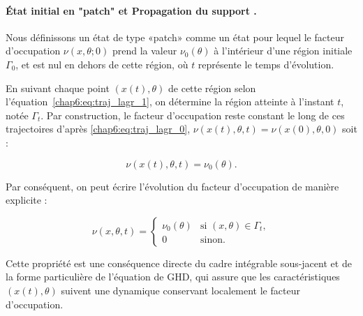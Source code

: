 

\medskip

\paragraph{État initial en "patch" et Propagation du support .}
Nous définissons un état de type «patch» comme un état pour lequel le facteur d’occupation \(\nu(x,\theta;0)\) prend la valeur \(\nu_0(\theta)\) à l’intérieur d’une région initiale \(\Gamma_0\), et est nul en dehors de cette région, où \(t\) représente le temps d’évolution.

\medskip

En suivant chaque point $(x(t),\theta)$ de cette région selon l’équation~\eqref{chap6:eq:traj_lagr_1}, on détermine la région atteinte à l’instant $t$, notée $\Gamma_t$. Par construction, le facteur d’occupation reste constant le long de ces trajectoires d'après \eqref{chap6:eq:traj_lagr_0}, $\nu(x(t),\theta,t) = \nu(x(0),\theta,0)$  soit :

\begin{equation}
	\nu(x(t),\theta,t)  = \nu_0(\theta).
\end{equation}

Par conséquent, on peut écrire l’évolution du facteur d’occupation de manière explicite :

\begin{equation}
\label{eq:contour_support}
\nu(x, \theta, t) =
\begin{cases}
\nu_0(\theta) & \text{si } (x,\theta) \in \Gamma_t, \\
0 & \text{sinon}.
\end{cases}
\end{equation}

Cette propriété est une conséquence directe du cadre intégrable sous-jacent et de la forme particulière de l’équation de \gls{GHD}, qui assure que les caractéristiques $(x(t),\theta)$ suivent une dynamique conservant localement le facteur d’occupation.

\medskip

